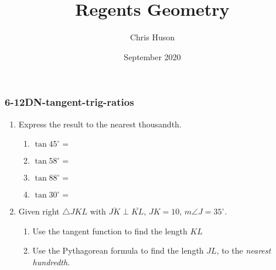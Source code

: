 \documentclass[12pt, twoside]{article}
\title{Regents Geometry}
\author{Chris Huson}
\date{September 2020}
\begin{document}
\subsubsection*{6-12DN-tangent-trig-ratios}
\begin{enumerate}
\item Express the result to the nearest thousandth.  \vspace{.5cm}
      \begin{multicols}{2}
        \begin{enumerate}
          \item $\tan 45^\circ = $ \vspace{1cm}
          \item $\tan 58^\circ =$
          \item $\tan 88^\circ = $ \vspace{1cm}
          \item $\tan 30^\circ =$
        \end{enumerate}
      \end{multicols} \vspace{1cm}

\item Given right $\triangle JKL$ with $\overline{JK} \perp \overline{KL}$, $JK=10$, $m\angle J=35^\circ$.
      \begin{flushright}
         \vspace{1cm}
      \end{flushright}
      \begin{enumerate}
        \item Use the tangent function to find the length $KL$\\[3cm]
        \item Use the Pythagorean formula to find the length $JL$, to the \emph{nearest hundredth}.\\[3cm]


\end{enumerate}
\end{enumerate}
\end{document}
